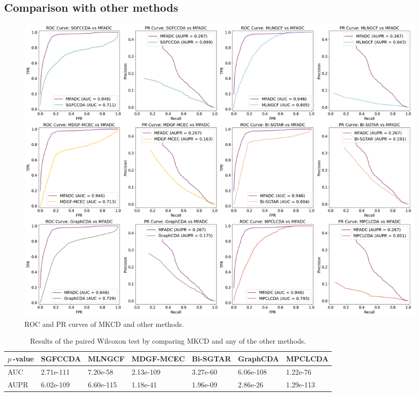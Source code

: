 \documentclass{bioinfo}
\begin{document}
\begin{methods}
\subsection{Comparison with other methods}
\begin{figure}[!t]
    \centering
    \includegraphics[width=8in]{fig/roc_pr_split.png}
    \caption{ROC and PR curves of MKCD and other methods.}
    \label{fig:roc_pr_split}
\end{figure}

\begin{table}[!t]
	\label{tab:02}
	\centering
	\begin{threeparttable}[b]
		\vspace{0.4cm}
		\renewcommand{\arraystretch}{1.3}  %
		\caption{Results of the paired Wilcoxon test by comparing MKCD and any of the other methods.  }\label{tab:tab2}
        \setlength{\tabcolsep}{0pt}  %
		\begin{tabular}{p{3.0cm}<{\centering}  p{2.9cm}<{\centering} p{2.9cm}<{\centering} p{2.9cm}<{\centering} p{2.9cm}<{\centering} p{2.9cm}<{\centering} p{2.9cm}<{\centering}}
			\hline
            \textbf{$p\ $-value} & \textbf{SGFCCDA} & \textbf{MLNGCF} & \textbf{MDGF-MCEC} &  \textbf{Bi-SGTAR} & \textbf{GraphCDA} & \textbf{MPCLCDA}\\
			\hline
		    AUC & 2.71e-111 & 7.20e-58 & 2.13e-109 &  3.27e-60 & 6.06e-108 & 1.22e-76 \\
		    AUPR & 6.02e-109 & 6.60e-115 & 1.18e-41 &  1.96e-09 & 2.86e-26 & 1.29e-113 \\
			\hline
		\end{tabular}
	\end{threeparttable}
	\vspace{-0.1cm}
\end{table}



\end{methods}
\end{document}
